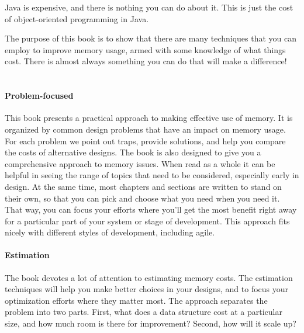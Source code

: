{Java is expensive, and there is nothing you can do about it.
This is just the cost of object-oriented programming in Java.
}

The purpose of this book is to show that there are
many techniques that you can employ to improve memory usage, armed with some
knowledge of what things cost. There is almost always something you can do that
will make a difference!



\section{\thetitle}
\paragraph{Problem-focused}This book presents a practical approach to making
effective use of memory.
It is organized by
common design problems that have an impact on memory usage. For each problem we point out
traps, provide solutions, and help you compare the costs of alternative
designs.
The book is also designed to give you a comprehensive
approach to memory issues. When read as a whole it can be helpful in seeing the range of topics that need to
be considered, especially early in design. At the same time, most chapters and sections are written to stand
on their own, so that you can pick and choose what you need when you need it. That way, you can focus your efforts
where you'll get the most benefit right away for a particular part of your system or stage of development. 
This approach fits nicely with different styles of development, including agile.

\paragraph{Estimation}The book devotes a lot of attention to estimating memory
costs. The estimation techniques will help you make better choices in your designs, and to focus your
optimization efforts where they matter most.
The approach separates the problem into two parts. First,
what does a data structure cost at a particular size, and how much room is there for improvement?
Second, how will it scale up?

